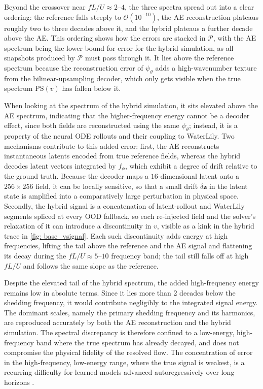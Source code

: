 Beyond the crossover near $fL/U \approx 2$--$4$, the three spectra spread out into a clear ordering: the reference falls steeply to $\mathcal{O}(10^{-10})$, the AE reconstruction plateaus roughly two to three decades above it, and the hybrid plateaus a further decade above the AE. This ordering shows how the errors are stacked in $\mathcal{P}$, with the AE spectrum being the lower bound for error for the hybrid simulation, as all snapshots produced by $\mathcal{P}$ must pass through it. It lies above the reference spectrum because the reconstruction error of $\psi_\theta$ adds a high-wavenumber texture from the bilinear-upsampling decoder, which only gets visible when the true spectrum $\mathrm{PS}(v)$ has fallen below it.

When looking at the spectrum of the hybrid simulation, it sits elevated above the AE spectrum, indicating that the higher-frequency energy cannot be a decoder effect, since both fields are reconstructed using the same $\psi_\theta$; instead, it is a property of the neural ODE rollouts and their coupling to WaterLily. Two mechanisms contribute to this added error: first, the AE reconstructs instantaneous latents encoded from true reference fields, whereas the hybrid decodes latent vectors integrated by $f_\phi$, which exhibit a degree of drift relative to the ground truth. Because the decoder maps a $16$-dimensional latent onto a $256 \times 256$ field, it can be locally sensitive, so that a small drift $\delta\mathbf{z}$ in the latent state is amplified into a comparatively large perturbation in physical space. Secondly, the hybrid signal is a concatenation of latent-rollout and WaterLily segments spliced at every OOD fallback, so each re-injected field and the solver's relaxation of it can introduce a discontinuity in $v$, visible as a kink in the hybrid trace in \autoref{fig: base_vsignal}. Each such discontinuity adds energy at high frequencies, lifting the tail above the reference and the AE signal and flattening its decay during the $fL/U \approx 5$--$10$  frequency band; the tail still falls off at high $fL/U$ and follows the same slope as the reference.

Despite the elevated tail of the hybrid spectrum, the added high-frequency energy remains low in absolute terms. Since it lies more than 2 decades below the shedding frequency, it would contribute negligibly to the integrated signal energy. The dominant scales, namely the primary shedding frequency and its harmonics, are reproduced accurately by both the AE reconstruction and the hybrid simulation. The spectral discrepancy is therefore confined to a low-energy, high-frequency band where the true spectrum has already decayed, and does not compromise the physical fidelity of the resolved flow. The concentration of error in the high-frequency, low-energy range, where the true signal is weakest, is a recurring difficulty for learned models advanced autoregressively over long horizons \cite{Lippe2023}.


